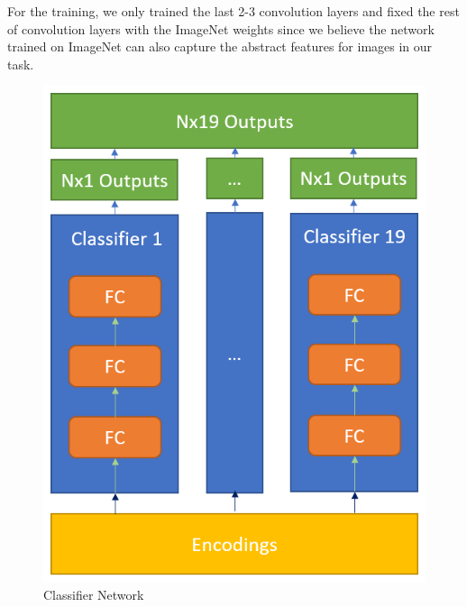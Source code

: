 \documentclass[12pt]{article} %
\begin{document}
For the training, we only trained the last 2-3 convolution layers and fixed the rest of convolution layers with the ImageNet weights since we believe the network trained on ImageNet can also capture the abstract features for images in our task.

\begin{figure}[H]
\centering
\begin{minipage}{0.31\textwidth}
  \centering
  \includegraphics[width=\linewidth]{classifier.png}
  \caption{Classifier Network}
  \label{fig:classifier}
\end{minipage}%
\begin{minipage}{0.37\textwidth}
  \centering

\end{minipage}
\end{figure}
\end{document}
